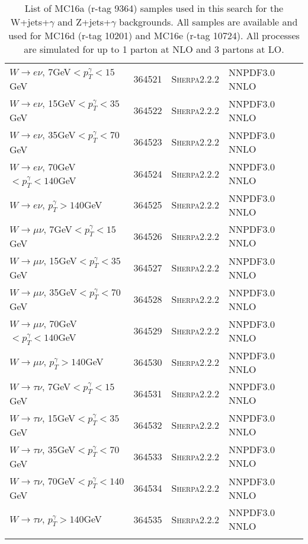 \begin{table}[h!]
\begin{center}
{\begin{tabular}{@{} lcll @{}}
$W\rightarrow e\nu$, 7GeV$<p_T^\gamma<15$GeV & 364521& \textsc{Sherpa2.2.2} &NNPDF3.0 NNLO \\
$W\rightarrow e\nu$, 15GeV$<p_T^\gamma<35$GeV & 364522& \textsc{Sherpa2.2.2} &NNPDF3.0 NNLO \\
$W\rightarrow e\nu$, 35GeV$<p_T^\gamma<70$GeV & 364523& \textsc{Sherpa2.2.2} &NNPDF3.0 NNLO \\
$W\rightarrow e\nu$, 70GeV$<p_T^\gamma<140$GeV & 364524& \textsc{Sherpa2.2.2} &NNPDF3.0 NNLO \\
$W\rightarrow e\nu$, $p_T^\gamma>140$GeV & 364525& \textsc{Sherpa2.2.2} &NNPDF3.0 NNLO \\
$W\rightarrow \mu\nu$, 7GeV$<p_T^\gamma<15$GeV & 364526& \textsc{Sherpa2.2.2} &NNPDF3.0 NNLO \\
$W\rightarrow \mu\nu$, 15GeV$<p_T^\gamma<35$GeV & 364527& \textsc{Sherpa2.2.2} &NNPDF3.0 NNLO \\
$W\rightarrow \mu\nu$, 35GeV$<p_T^\gamma<70$GeV & 364528& \textsc{Sherpa2.2.2} &NNPDF3.0 NNLO \\
$W\rightarrow \mu\nu$, 70GeV$<p_T^\gamma<140$GeV & 364529& \textsc{Sherpa2.2.2} &NNPDF3.0 NNLO \\
$W\rightarrow \mu\nu$, $p_T^\gamma>140$GeV & 364530& \textsc{Sherpa2.2.2} &NNPDF3.0 NNLO \\
$W\rightarrow \tau\nu$, 7GeV$<p_T^\gamma<15$GeV & 364531& \textsc{Sherpa2.2.2} &NNPDF3.0 NNLO \\
$W\rightarrow \tau\nu$, 15GeV$<p_T^\gamma<35$GeV & 364532& \textsc{Sherpa2.2.2} &NNPDF3.0 NNLO \\
$W\rightarrow \tau\nu$, 35GeV$<p_T^\gamma<70$GeV & 364533& \textsc{Sherpa2.2.2} &NNPDF3.0 NNLO \\
$W\rightarrow \tau\nu$, 70GeV$<p_T^\gamma<140$GeV & 364534& \textsc{Sherpa2.2.2} &NNPDF3.0 NNLO \\
$W\rightarrow \tau\nu$, $p_T^\gamma>140$GeV & 364535& \textsc{Sherpa2.2.2} &NNPDF3.0 NNLO \\
 \hhline{====}
\end{tabular}
\caption{List of MC16a (r-tag  9364) samples used in this search for the W+jets+$\gamma$ and Z+jets+$\gamma$ backgrounds.  All samples are available and used for MC16d (r-tag 10201) and MC16e (r-tag 10724). All processes are simulated for up to 1 parton at NLO and 3 partons at LO.}
\label{tab:MCSample5}
}
\end{center}
\end{table}
